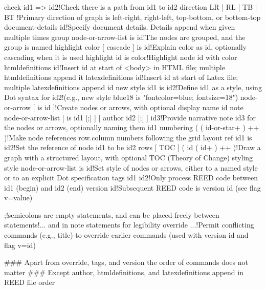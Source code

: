 check id1 => id2!Check there is a path from id1 to id2
direction { LR | RL | TB | BT }!Primary direction of graph is left-right, right-left, top-bottom, or bottom-top
document-details id!Specify document details. Details append when given multiple times
group node-or-arrow-list is id!The nodes are grouped, and the group is named
highlight color [ cascade ] is id!Explain color as id, optionally cascading when it is used
highlight id is color!Highlight node id with color
htmldefinitions id!Insert id at start of <body> in HTML file; multiple htmldefinitions append it
latexdefinitions id!Insert id at start of Latex file; multiple latexdefinitions append id 
new style id1 is id2!Define id1 as a style, using Dot syntax for id2!(e.g., new style blue18 is "fontcolor=blue; fontsize=18")
node-or-arrow [ is id ]!Create nodes or arrows, with optional display name id
note node-or-arrow-list [ is id1 [;] ] [ author id2 [;] ] id3!Provide narrative note id3 for the nodes or arrows, optionally naming them id1
numbering ( { ( id-or-star+ ) }++ )!Make node references row.column numbers following the grid layout
ref id1 is id2!Set the reference of node id1 to be id2
rows [ TOC ] ( { id ( id+ ) }++ )!Draw a graph with a structured layout, with optional TOC (Theory of Change) styling
style node-or-arrow-list is id!Set style of nodes or arrows, either to a named style or to an explicit Dot specification
tags id1 id2!Only process REED code between id1 (begin) and id2 (end)
version id!Subsequent REED code is version id (see flag v=value)

;!semicolons are empty statements, and can be placed freely between statements!... and in note statements for legibility
override ...!Permit conflicting commands (e.g., title) to override earlier commands (used with version id and flag v=id)

### Apart from override, tags, and version the order of commands does not matter
### Except author, htmldefinitions, and latexdefinitions append in REED file order

